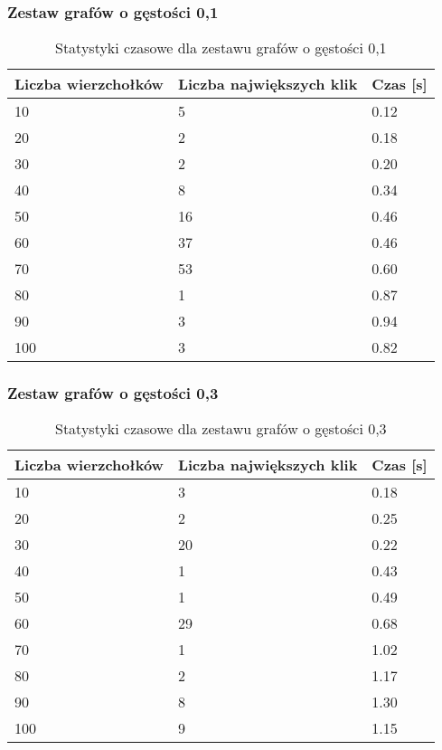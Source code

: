 \documentclass[12pt, a4paper]{article}
\begin{document}
\subsubsection*{Zestaw grafów o gęstości 0,1}
\begin{table}[H]
\caption{Statystyki czasowe dla zestawu grafów o gęstości 0,1}
\begin{center}
    \begin{tabular}{|l|l|l|}
    \hline
    Liczba wierzchołków & Liczba największych klik & Czas [s] \\ \hline
    10 & 5 & 0.12 \\ \hline
    20 & 2 & 0.18 \\ \hline
    30 & 2 & 0.20 \\ \hline
    40 & 8 & 0.34 \\ \hline
    50 & 16 & 0.46 \\ \hline
    60 & 37 & 0.46 \\ \hline
    70 & 53 & 0.60 \\ \hline
    80 & 1 & 0.87 \\ \hline
    90 & 3 & 0.94 \\ \hline
    100 & 3 & 0.82 \\ \hline
    \end{tabular}
\end{center}
\end{table}
\subsubsection*{Zestaw grafów o gęstości 0,3}
\begin{table}[H]
\caption{Statystyki czasowe dla zestawu grafów o gęstości 0,3}
\begin{center}
    \begin{tabular}{|l|l|l|}
    \hline
    Liczba wierzchołków & Liczba największych klik & Czas [s] \\ \hline
    10 & 3 & 0.18 \\ \hline
    20 & 2 & 0.25 \\ \hline
    30 & 20 & 0.22 \\ \hline
    40 & 1 & 0.43 \\ \hline
    50 & 1 & 0.49 \\ \hline
    60 & 29 & 0.68 \\ \hline
    70 & 1 & 1.02 \\ \hline
    80 & 2 & 1.17 \\ \hline
    90 & 8 & 1.30 \\ \hline
    100 & 9 & 1.15 \\ \hline
    \end{tabular}
\end{center}
\end{table}
\end{document}
